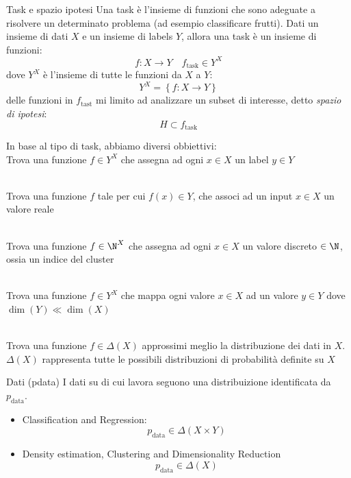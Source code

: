 \begin{definizione}{Task e spazio ipotesi}
	Una task è l'insieme di funzioni che sono adeguate a risolvere un determinato problema (ad esempio classificare frutti). Dati un insieme di dati $ X $ e un insieme di labels $ Y $, allora una task è un insieme di funzioni:
	\[
		f: X \to Y \quad f_{\text{task}} \in Y^{X}
	\]
	dove $ Y^{X} $ è l'insieme di tutte le funzioni da $ X $ a $ Y $:
	\[
		Y^{X} = \left\{f : X \to  Y\right\}
	\]
	delle funzioni in $ f_{\text{tast}} $ mi limito ad analizzare un subset di interesse, detto \textit{spazio di ipotesi}:
	\[
		H \subset f_{\text{task}}
	\]
\end{definizione}


In base al tipo di task, abbiamo diversi obbiettivi:
\vskip3mm
\\
Trova una funzione $f \in  Y^{X} $  che assegna ad ogni $ x \in X $ un label $ y \in Y $

\vskip3mm
\\
Trova una funzione $ f $ tale per cui $ f\left(x\right) \in Y $, che associ ad un input $ x \in X $ un valore reale

\vskip3mm
\\
Trova una funzione $f \in  \N^{X} $  che assegna ad ogni $ x \in X $ un valore discreto $ \in \N $, ossia un indice del cluster

\vskip3mm
\\
Trova una funzione $f \in  Y^{X} $  che mappa ogni valore $ x \in X $ ad un valore $ y \in Y $ dove $ \operatorname{dim}\left(Y\right) \ll \operatorname{dim}\left(X\right) $

\vskip3mm
\\
Trova una funzione $f \in  \Delta \left(X\right) $  approssimi meglio la distribuzione dei dati in $ X $. $ \Delta \left(X\right) $ rappresenta tutte le possibili distribuzioni di probabilità definite su $ X $


\begin{definizione}{Dati (pdata)}
	I dati su di cui lavora seguono una distribuizione identificata da $ p_\text{data} $.
	\begin{itemize}
		\item Classification and Regression:
		      \[
			      p_{\text{data}} \in \Delta \left(X \times Y\right)
		      \]
		\item Density estimation, Clustering and Dimensionality Reduction
		      \[
			      p_{\text{data}} \in \Delta \left(X\right)
		      \]
	\end{itemize}
\end{definizione}


